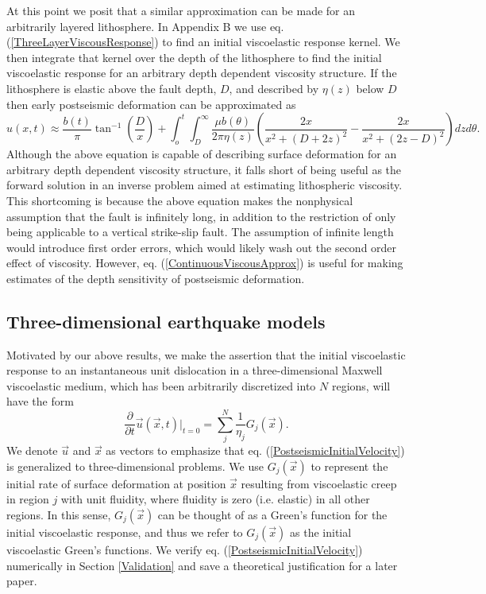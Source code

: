At this point we posit that a similar approximation can be made for an
arbitrarily layered lithosphere. In Appendix B we use
eq. (\ref{ThreeLayerViscousResponse}) to find an initial viscoelastic
response kernel.  We then integrate that kernel over the depth of the
lithosphere to find the initial viscoelastic response for an arbitrary
depth dependent viscosity structure.  If the lithosphere is elastic
above the fault depth, $D$, and described by $\eta(z)$ below $D$ then
early postseismic deformation can be approximated as
\begin{equation}\label{ContinuousViscousApprox}
u(x,t) \approx \frac{b(t)}{\pi}\tan^{-1}(\frac{D}{x}) + 
               \int_o^t\int_D^\infty \frac{\mu b(\theta)}{2\pi\eta(z)}
                                    \left(\frac{2x}{x^2 + \left(D + 2z\right)^2} - 
                                    \frac{2x}{x^2 + \left(2z - D\right)^2}\right)
                                    dz d\theta.
\end{equation}
Although the above equation is capable of describing surface
deformation for an arbitrary depth dependent viscosity structure, it
falls short of being useful as the forward solution in an inverse
problem aimed at estimating lithospheric viscosity.  This shortcoming
is because the above equation makes the nonphysical assumption that the
fault is infinitely long, in addition to the restriction of only being
applicable to a vertical strike-slip fault.  The assumption of
infinite length would introduce first order errors, which would likely
wash out the second order effect of viscosity. However,
eq. (\ref{ContinuousViscousApprox}) is useful for making estimates of
the depth sensitivity of postseismic deformation.

\subsection{Three-dimensional earthquake models}\label{3DModel}
Motivated by our above results, we make the assertion that the initial
viscoelastic response to an instantaneous unit dislocation in a
three-dimensional Maxwell viscoelastic medium, which has been
arbitrarily discretized into $N$ regions, will have the form
\begin{equation}\label{PostseismicInitialVelocity}
  \frac{\partial}{\partial t}\vec{u}(\vec{x},t)\big|_{t=0} = \sum_j^N\frac{1}{\eta_j}G_j(\vec{x}).
\end{equation}
We denote $\vec{u}$ and $\vec{x}$ as vectors to emphasize that
eq. (\ref{PostseismicInitialVelocity}) is generalized to
three-dimensional problems.  We use $G_j(\vec{x})$ to represent the
initial rate of surface deformation at position $\vec{x}$ resulting
from viscoelastic creep in region $j$ with unit fluidity, where
fluidity is zero (i.e. elastic) in all other regions.  In this sense,
$G_j(\vec{x})$ can be thought of as a Green's function for the initial
viscoelastic response, and thus we refer to $G_j(\vec{x})$ as the initial
viscoelastic Green's functions.  We verify
eq. (\ref{PostseismicInitialVelocity}) numerically in Section \ref{Validation} and
save a theoretical justification for a later paper.

